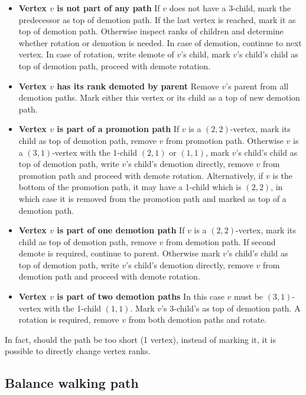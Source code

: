\begin{itemize}

\item {\bfseries Vertex $v$ is not part of any path} If $v$ does not have a 3-child, mark the predecessor as top of demotion path. If the last vertex is reached, mark it as top of demotion path.  Otherwise inspect ranks of children and determine whether rotation or demotion is needed. In case of demotion, continue to next vertex. In case of rotation, write demote of $v$'s child, mark $v$'s child's child as top of demotion path, proceed with demote rotation.

\item {\bfseries Vertex $v$ has its rank demoted by parent} Remove $v$'s parent from all demotion paths. Mark either this vertex or its child as a top of new demotion path.

\item {\bfseries Vertex $v$ is part of a promotion path} If $v$ is a $(2,2)$-vertex, mark its child as top of demotion path, remove $v$ from promotion path. Otherwise $v$ is a $(3,1)$-vertex with the 1-child $(2,1)$ or $(1,1)$, mark $v$'s child's child as top of demotion path, write $v$'s child's demotion directly, remove $v$ from promotion path and proceed with demote rotation. Alternatively, if $v$ is the bottom of the promotion path, it may have a 1-child which is $(2,2)$, in which case it is removed from the promotion path and marked as top of a demotion path.

\item {\bfseries Vertex $v$ is part of one demotion path} If $v$ is a $(2,2)$-vertex, mark its child as top of demotion path, remove $v$ from demotion path. If second demote is required, continue to parent. Otherwise mark $v$'s child's child as top of demotion path, write $v$'s child's demotion directly, remove $v$ from demotion path and proceed with demote rotation. 

\item {\bfseries Vertex $v$ is part of two demotion paths} In this case $v$ must be $(3,1)$-vertex with the 1-child $(1,1)$. Mark $v$'s 3-child's as top of demotion path. A rotation is required, remove $v$ from both demotion paths and rotate.

\end{itemize}

In fact, should the path be too short (1 vertex), instead of marking it, it is possible to directly change vertex ranks.

\subsection{Balance walking path}

